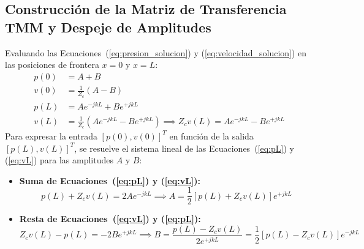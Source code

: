 \documentclass[11pt,a4paper]{article}
\begin{document}
\subsection{Construcción de la Matriz de Transferencia TMM y Despeje de Amplitudes}
Evaluando las Ecuaciones~(\ref{eq:presion_solucion}) y (\ref{eq:velocidad_solucion}) en las posiciones de frontera $x=0$ y $x=L$:
\begin{align}
p(0) &= A + B \label{eq:p0_sum}\\
v(0) &= \frac{1}{Z_c}(A - B) \label{eq:v0_sub}\\
p(L) &= A e^{-j k L} + B e^{+j k L} \label{eq:pL}\\
v(L) &= \frac{1}{Z_c} \left( A e^{-j k L} - B e^{+j k L} \right) \implies Z_c v(L) = A e^{-j k L} - B e^{+j k L} \label{eq:vL}
\end{align}
Para expresar la entrada $[p(0), v(0)]^T$ en función de la salida $[p(L), v(L)]^T$, se resuelve el sistema lineal de las Ecuaciones~(\ref{eq:pL}) y (\ref{eq:vL}) para las amplitudes $A$ y $B$:
\begin{itemize}
\item \textbf{Suma de Ecuaciones~(\ref{eq:pL}) y (\ref{eq:vL}):}
\begin{equation}
p(L) + Z_c v(L) = 2 A e^{-j k L} \implies A = \frac{1}{2} \left[ p(L) + Z_c v(L) \right] e^{+j k L}
\label{eq:amp_A}
\end{equation}

\item \textbf{Resta de Ecuaciones~(\ref{eq:vL}) y (\ref{eq:pL}):}
\begin{equation}
Z_c v(L) - p(L) = -2 B e^{+j k L} \implies B = \frac{p(L) - Z_c v(L)}{2 e^{+j k L}} = \frac{1}{2} \left[ p(L) - Z_c v(L) \right] e^{-j k L}
\label{eq:amp_B}
\end{equation}
\end{itemize}
\end{document}
